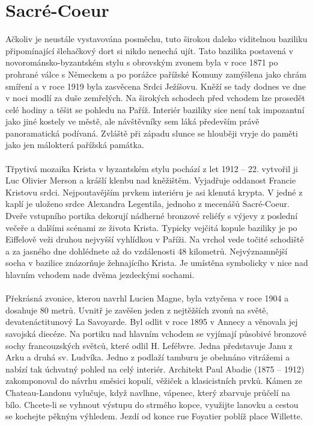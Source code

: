 \section{Sacré-Coeur}
Ačkoliv je neustále vystavována posměchu, tuto širokou daleko viditelnou baziliku připomínající šlehačkový dort si nikdo nenechá ujít. Tato bazilika postavená v novorománsko-byzantském stylu s obrovským zvonem byla v roce 1871 po prohrané válce s Německem a po porážce pařížské Komuny zamýšlena jako chrám smíření a v roce 1919 byla zasvěcena Srdci Ježíšovu. Kněží se tady dodnes ve dne v noci modlí za duše zemřelých. Na širokých schodech před vchodem lze prosedět celé hodiny a těšit se pohledu na Paříž. Interiér baziliky sice není tak impozantní jako jiné kostely ve městě, ale návštěvníky sem láká především právě panoramatická podívaná. Zvláště při západu slunce se hlouběji vryje do paměti jako jen málokterá pařížská památka.\\
\\Třpytivá mozaika Krista v byzantském stylu pochází z let 1912 – 22. vytvořil ji Luc Olivier Merson a krášlí klenbu nad kněžištěm. Vyjadřuje oddanost Francie Kristovu srdci. Nejpoutavějším prvkem interiéru je asi klenutá krypta. V jedné z kaplí je uloženo srdce Alexandra Legentila, jednoho z mecenášů Sacré-Coeur. Dveře vstupního portika dekorují nádherné bronzové reliéfy s výjevy z poslední večeře a dalšími scénami ze života Krista. Typicky vejčitá kopule baziliky je po Eiffelově veži druhou nejvyšší vyhlídkou v Paříži. Na vrchol vede točité schodiště a za jasného dne dohlédnete až do vzdálenosti 48 kilometrů. Nejvýznamnější socha v bazilice znázorňuje žehnajícího Krista. Je umístěna symbolicky v nice nad hlavním vchodem nade dvěma jezdeckými sochami.\\
\\Překrásná zvonice, kterou navrhl Lucien Magne, byla vztyčena v roce 1904 a dosahuje 80 metrů. Uvnitř je zavěšen jeden z nejtěžších zvonů na světě, devatenáctitunový La Savoyarde. Byl odlit v roce 1895 v Annecy a věnovala jej savojská diecéze. Na portiku nad hlavním vchodem se vyjímají působivé bronzové sochy francouzských světců, které odlil H. Lefébvre. Jedna představuje Janu z Arku a druhá sv. Ludvíka. Jedno z podlaží tamburu je obehnáno vitrážemi a nabízí tak úchvatný pohled na celý interiér. Architekt Paul Abadie (1875 – 1912) zakomponoval do návrhu směsici kopulí, věžiček a klasicistních prvků. Kámen ze Chateau-Landonu vylučuje, když navlhne, vápenec, který zbarvuje průčelí na bílo. Chcete-li se vyhnout výstupu do strmého kopce, využijte lanovku a cestou se kochejte pěkným výhledem. Jezdí od konce rue Foyatier poblíž place Willette.


